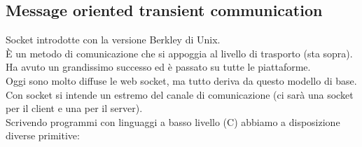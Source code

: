 \subsection{Message oriented transient communication}
Socket introdotte con la versione Berkley di Unix.\\
È un metodo di comunicazione che si appoggia al livello di trasporto (sta sopra). Ha avuto un grandissimo successo ed è passato su tutte le piattaforme. \\
Oggi sono molto diffuse le web socket, ma tutto deriva da questo modello di base.\\

Con socket si intende un estremo del canale di comunicazione (ci sarà una socket per il client e una per il server).\\
Scrivendo programmi con linguaggi a basso livello (C) abbiamo a disposizione diverse primitive:

